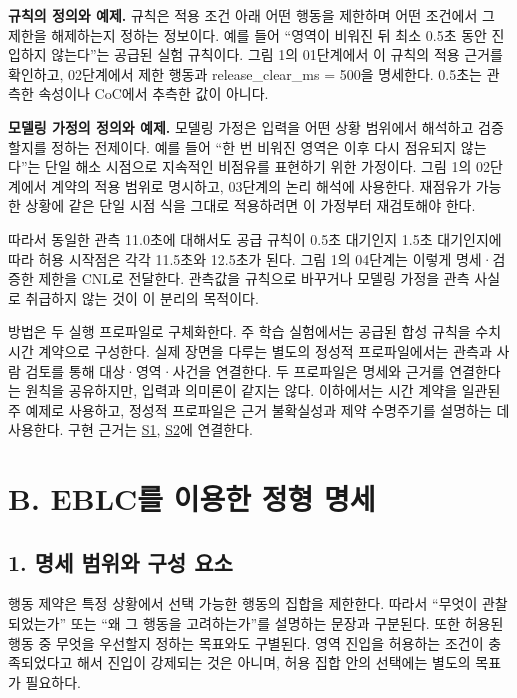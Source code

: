 \documentclass[11pt,a4paper]{article}
\begin{document}
\textbf{규칙의 정의와 예제.} 규칙은 적용 조건 아래 어떤 행동을 제한하며 어떤 조건에서 그 제한을 해제하는지 정하는 정보이다. 예를 들어 “영역이 비워진 뒤 최소 0.5초 동안 진입하지 않는다”는 공급된 실험 규칙이다. 그림 1의 01단계에서 이 규칙의 적용 근거를 확인하고, 02단계에서 제한 행동과 release\_clear\_ms = 500을 명세한다. 0.5초는 관측한 속성이나 CoC에서 추측한 값이 아니다.\par

\textbf{모델링 가정의 정의와 예제.} 모델링 가정은 입력을 어떤 상황 범위에서 해석하고 검증할지를 정하는 전제이다. 예를 들어 “한 번 비워진 영역은 이후 다시 점유되지 않는다”는 단일 해소 시점으로 지속적인 비점유를 표현하기 위한 가정이다. 그림 1의 02단계에서 계약의 적용 범위로 명시하고, 03단계의 논리 해석에 사용한다. 재점유가 가능한 상황에 같은 단일 시점 식을 그대로 적용하려면 이 가정부터 재검토해야 한다.\par

따라서 동일한 관측 11.0초에 대해서도 공급 규칙이 0.5초 대기인지 1.5초 대기인지에 따라 허용 시작점은 각각 11.5초와 12.5초가 된다. 그림 1의 04단계는 이렇게 명세·검증한 제한을 CNL로 전달한다. 관측값을 규칙으로 바꾸거나 모델링 가정을 관측 사실로 취급하지 않는 것이 이 분리의 목적이다.\par

방법은 두 실행 프로파일로 구체화한다. 주 학습 실험에서는 공급된 합성 규칙을 수치 시간 계약으로 구성한다. 실제 장면을 다루는 별도의 정성적 프로파일에서는 관측과 사람 검토를 통해 대상·영역·사건을 연결한다. 두 프로파일은 명세와 근거를 연결한다는 원칙을 공유하지만, 입력과 의미론이 같지는 않다. 이하에서는 시간 계약을 일관된 주 예제로 사용하고, 정성적 프로파일은 근거 불확실성과 제약 수명주기를 설명하는 데 사용한다. 구현 근거는 \href{\detokenize{../../../../../../projects/04-guardsynth-coc/experiments/paper1_cnl_learning/temporal_preservation.py}}{S1}, \href{\detokenize{../../../../../../platforms/eblc-bcv/src/guard_synth_eblc/action_contract.py}}{S2}에 연결한다.\par

\section*{B. EBLC를 이용한 정형 명세}

\subsection*{1. 명세 범위와 구성 요소}

행동 제약은 특정 상황에서 선택 가능한 행동의 집합을 제한한다. 따라서 “무엇이 관찰되었는가” 또는 “왜 그 행동을 고려하는가”를 설명하는 문장과 구분된다. 또한 허용된 행동 중 무엇을 우선할지 정하는 목표와도 구별된다. 영역 진입을 허용하는 조건이 충족되었다고 해서 진입이 강제되는 것은 아니며, 허용 집합 안의 선택에는 별도의 목표가 필요하다.\par
\end{document}
